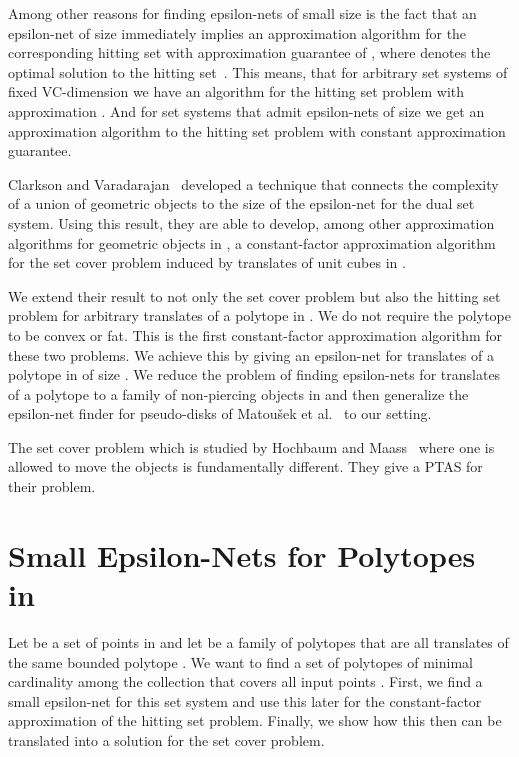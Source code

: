\documentclass{stacs_proc}
\begin{document}
Among other reasons for finding epsilon-nets of small size is the fact
that an epsilon-net of size  immediately implies an
approximation algorithm for the corresponding hitting set with
approximation guarantee of , where  denotes the
optimal solution to the hitting set~\cite{PA95}. This means, that for
arbitrary set systems of fixed VC-dimension we have an algorithm for
the hitting set problem with approximation .  
And for set systems that admit epsilon-nets of size  we
get an approximation algorithm to the hitting set problem with
constant approximation guarantee.    




Clarkson and Varadarajan~\cite{CV05} developed a technique that
connects the complexity of a union of geometric objects to the size of
the epsilon-net for the dual set system. Using this result, they are
able to develop, among other approximation algorithms for geometric
objects in , a constant-factor approximation algorithm for the
set cover problem induced by translates of unit cubes in .  

We extend their result to not only the set cover problem but also the
hitting set problem for arbitrary translates of a polytope in
. We do not require the polytope to be convex or fat. This is the
first constant-factor approximation algorithm for these two
problems. We achieve this by giving an epsilon-net for translates of a
polytope in  of size . We reduce the problem
of finding epsilon-nets for translates of a polytope to a family of
non-piercing objects in  and then generalize the epsilon-net
finder for pseudo-disks of Matou\v{s}ek et al.~\cite{MSW90} to our
setting.     

The set cover problem
which is studied by Hochbaum and Maass~\cite{HM85} where one is
allowed to move the objects is fundamentally different. They give a
PTAS for their problem.  






\section{Small Epsilon-Nets for Polytopes in }



Let  be a set of  points in  and let  be a family of
polytopes  that are all translates of the same bounded polytope
.
We want to find a set of polytopes of minimal cardinality among the
collection  that covers all input points . 
First, we find a small epsilon-net for this set system and use this
later for the constant-factor approximation of the hitting set
problem. Finally, we show how this then can be translated into a
solution for the set cover problem.  
\end{document}
